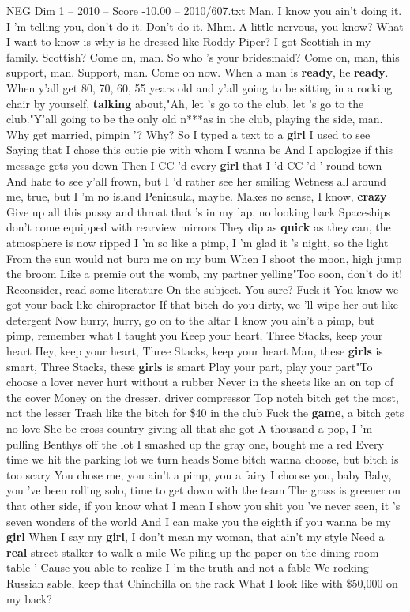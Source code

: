 \begin{textsample}{NEG Dim 1 – 2010 – Score -10.00 – 2010/607.txt}  \label{ex:f1_neg_027}
Man, I know you ain't doing it.
I 'm telling you, don't do it.
Don't do it.
Mhm.
A little nervous, you know?
What I want to know is why is he dressed like Roddy Piper?
I got Scottish in my family.
Scottish?
Come on, man.
So who 's your bridesmaid?
Come on, man, this support, man.
Support, man.
Come on now.
When a man is \textbf{ready}, he \textbf{ready}.
When y'all get 80, 70, 60, 55 years old and y'all going to be sitting in a rocking chair by yourself, \textbf{talking} about,"Ah, let 's go to the club, let 's go to the club."Y'all going to be the only old n***as in the club, playing the side, man.
Why get married, pimpin '?
Why?
So I typed a text to a \textbf{girl} I used to see Saying that I chose this cutie pie with whom I wanna be And I apologize if this message gets you down Then I CC 'd every \textbf{girl} that I 'd CC 'd ' round town And hate to see y'all frown, but I 'd rather see her smiling Wetness all around me, true, but I 'm no island Peninsula, maybe.
Makes no sense, I know, \textbf{crazy} Give up all this pussy and throat that 's in my lap, no looking back Spaceships don't come equipped with rearview mirrors They dip as \textbf{quick} as they can, the atmosphere is now ripped I 'm so like a pimp, I 'm glad it 's night, so the light From the sun would not burn me on my bum When I shoot the moon, high jump the broom Like a premie out the womb, my partner yelling"Too soon, don't do it!
Reconsider, read some literature On the subject.
You sure?
Fuck it You know we got your back like chiropractor If that bitch do you dirty, we 'll wipe her out like detergent Now hurry, hurry, go on to the altar I know you ain't a pimp, but pimp, remember what I taught you Keep your heart, Three Stacks, keep your heart Hey, keep your heart, Three Stacks, keep your heart Man, these \textbf{girls} is smart, Three Stacks, these \textbf{girls} is smart Play your part, play your part"To choose a lover never hurt without a rubber Never in the sheets like an on top of the cover Money on the dresser, driver compressor Top notch bitch get the most, not the lesser Trash like the bitch for \$40 in the club Fuck the \textbf{game}, a bitch gets no love She be cross country giving all that she got A thousand a pop, I 'm pulling Benthys off the lot I smashed up the gray one, bought me a red Every time we hit the parking lot we turn heads Some bitch wanna choose, but bitch is too scary You chose me, you ain't a pimp, you a fairy I choose you, baby Baby, you 've been rolling solo, time to get down with the team The grass is greener on that other side, if you know what I mean I show you shit you 've never seen, it 's seven wonders of the world And I can make you the eighth if you wanna be my \textbf{girl} When I say my \textbf{girl}, I don't mean my woman, that ain't my style Need a \textbf{real} street stalker to walk a mile We piling up the paper on the dining room table ' Cause you able to realize I 'm the truth and not a fable We rocking Russian sable, keep that Chinchilla on the rack What I look like with \$50,000 on my back?

\end{textsample}
